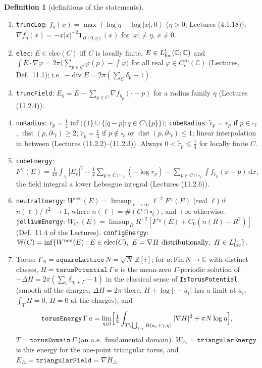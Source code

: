 \documentclass[11pt]{article}
\theoremstyle{definition}
\newtheorem{definition}[theorem]{Definition}
\theoremstyle{remark}
\newcommand{\C}{\mathbb C}
\newcommand{\Z}{\mathbb Z}
\newcommand{\dd}{\,\mathrm d}
\newcommand{\Wneu}{W^{\mathrm{neu}}}
\DeclareMathOperator{\dist}{dist}
\DeclareMathOperator{\Div}{div}
\begin{document}
\begin{definition}[definitions of the statements]\label{def:objects}
\begin{enumerate}[label=(\alph*)]
\item \texttt{truncLog}: $f_\eta(x)=\max(\log\eta-\log|x|,0)$ ($\eta>0$; Lectures (4.1.18));
  $\nabla f_\eta(x)=-x|x|^{-2}\mathbf 1_{B(0,\eta)}(x)$ for $|x|\ne\eta$, $x\ne0$.
\item \texttt{elec}: $E\in\mathrm{elec}(C)$ iff $C$ is locally finite, $E\in L^1_{\rm loc}(\C;\C)$ and
  $\int E\cdot\nabla\varphi=2\pi\bigl(\sum_{p\in C}\varphi(p)-\int\varphi\bigr)$ for all real
  $\varphi\in C^\infty_c(\C)$ (Lectures, Def.~11.1); i.e.\ $-\Div E=2\pi(\sum_C\delta_p-1)$.
\item \texttt{truncField}: $E_\eta=E-\sum_{p\in C}\nabla f_{\eta_p}(\cdot-p)$ for a radius family $\eta$
  (Lectures (11.2.4)).
\item \texttt{nnRadius}: $r_p=\frac14\inf\bigl(\{1\}\cup\{|q-p|:q\in C\setminus\{p\}\}\bigr)$; \texttt{cubeRadius}:
  $\tilde r_p=r_p$ if $p\in\square_\ell$, $\dist(p,\partial\square_\ell)\ge2$; $\tilde r_p=\frac14$ if
  $p\notin\square_\ell$ or $\dist(p,\partial\square_\ell)\le1$; linear interpolation in between
  (Lectures (11.2.2)--(11.2.3)). Always $0<\tilde r_p\le\frac14$ for locally finite $C$.
\item \texttt{cubeEnergy}: $F^{\square_\ell}(E)=\frac1{4\pi}\int_{\square_\ell}|E_{\tilde r}|^2
  -\frac12\sum_{p\in C\cap\square_\ell}(-\log\tilde r_p)-\sum_{p\in C\cap\square_\ell}\int f_{\tilde r_p}(x-p)\dd x$,
  the field integral a lower Lebesgue integral (Lectures (11.2.6)).
\item \texttt{neutralEnergy}: $\Wneu(E)=\limsup_{\ell\to\infty}\ell^{-2}F^{\square_\ell}(E)$ (real $\ell$) if
  $n(\ell)/\ell^2\to1$, where $n(\ell)=\#(C\cap\square_\ell)$, and $+\infty$ otherwise.
  \texttt{jelliumEnergy}: $W_{C_0}(E)=\limsup_R R^{-2}[F^{\square_R}(E)+C_0(n(R)-R^2)]$ (Def.~11.4 of the Lectures). \texttt{configEnergy}: $\mathbb W(C)=\inf\{\Wneu(E):E\in\mathrm{elec}(C),\ E=\nabla H
  \text{ distributionally},\ H\in L^1_{\rm loc}\}$.
\item Torus: $\Gamma_N=\texttt{squareLattice}\,N=\sqrt N\,\Z[i]$; for $a:\mathrm{Fin}\,N\to\C$ with distinct classes,
  $H=\texttt{torusPotential}\,\Gamma\,a$ is the mean-zero $\Gamma$-periodic solution of $-\Delta H=2\pi(\sum_i\delta_{a_i+\Gamma}-1)$
  in the classical sense of \texttt{IsTorusPotential} (smooth off the charges, $\Delta H=2\pi$ there,
  $H+\log|\cdot-a_i|$ has a limit at $a_i$, $\int_TH=0$, $H=0$ at the charges), and
  \[
  \texttt{torusEnergy}\,\Gamma\,a=\lim_{\eta\downarrow0}\Bigl[\tfrac12\int_{T\setminus\bigcup_{i,\gamma}B(a_i+\gamma,\eta)}|\nabla H|^2+\pi N\log\eta\Bigr],
  \]
  $T=\texttt{torusDomain}\,\Gamma$ (an a.e.\ fundamental domain). $W_\triangle=\texttt{triangularEnergy}$ is
  this energy for the one-point triangular torus, and $E_\triangle=\texttt{triangularField}=\nabla H_\triangle$.
\end{enumerate}
\end{definition}
\end{document}
